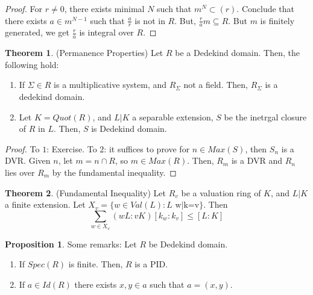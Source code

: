 \documentclass{article}
\theoremstyle{definition}
\newtheorem{theorem}{Theorem}[section]
\theoremstyle{definition}
\theoremstyle{definition}
\newtheorem{proposition}{Proposition}[section]
\theoremstyle{definition}
\theoremstyle{definition}
\theoremstyle{definition}
\theoremstyle{definition}
\begin{document}
\begin{proof}
    For $r\neq 0$, there exists minimal $N$ such that $m^N\subset (r)$. Conclude that there exists $a\in m^{N-1}$ such that $\frac{a}{r}$ is not in $R$. But, $\frac{r}{a}m\subseteq R$. But $m$ is finitely generated, we get $\frac{r}{a}$ is integral over $R$.  
\end{proof}


\begin{tcolorbox}[colback=red!5!white,colframe=red!30!white]
\begin{theorem}
(Permanence Properties) Let $R$ be a Dedekind domain. Then, the following hold:
\begin{enumerate}
    \item If $\Sigma\in R$ is a multiplicative system, and $R_{\Sigma}$ not a field. Then, $R_{\Sigma}$ is a dedekind domain. 
    \item Let $K=Quot(R)$, and $L|K$ a separable extension, $S$ be the inetrgal closure of $R$ in $L$. Then, $S$ is Dedekind domain.
\end{enumerate}
\end{theorem}
\end{tcolorbox}
\begin{proof}
     To $1$: Exercise. To $2$: it suffices to prove for $n\in Max(S)$, then $S_n$ is a DVR. Given $n$, let $m=n\cap R$, so $m\in Max(R)$. Then, $R_m$ is a DVR and $R_n$ lies over $R_m$ by the fundamental inequality.
\end{proof}


\begin{tcolorbox}[colback=red!5!white,colframe=red!30!white]
\begin{theorem}
(Fundamental Inequality) Let $R_v$ be a valuation ring of $K$, and $L|K$ a finite extension. Let $X_v=\{ w\in Val(L): L \textrm{ w|k=v} \}$. Then 
\[\sum_{w\in X_v}(wL:vK)[k_w:k_v]\leq [L:K]\] 
\end{theorem}
\end{tcolorbox}

\begin{tcolorbox}[colback=blue!5!white,colframe=blue!30!white]
\begin{proposition}
Some remarks: Let $R$ be Dedekind domain. 
\begin{enumerate}
    \item If $Spec(R)$ is finite. Then, $R$ is a PID. 
    \item If $a\in Id(R)$ there exists $x,y\in a$ such that $a=(x,y)$. 
\end{enumerate}
\end{proposition}
\end{tcolorbox}
\end{document}
